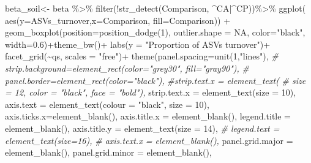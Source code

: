 \documentclass[]{interact}
\theoremstyle{plain}%
\theoremstyle{definition}
\theoremstyle{remark}
\newenvironment{Shaded}{\begin{snugshade}}{\end{snugshade}}
\newcommand{\AttributeTok}[1]{\textcolor[rgb]{0.77,0.63,0.00}{#1}}
\newcommand{\CommentTok}[1]{\textcolor[rgb]{0.56,0.35,0.01}{\textit{#1}}}
\newcommand{\ConstantTok}[1]{\textcolor[rgb]{0.00,0.00,0.00}{#1}}
\newcommand{\DecValTok}[1]{\textcolor[rgb]{0.00,0.00,0.81}{#1}}
\newcommand{\FloatTok}[1]{\textcolor[rgb]{0.00,0.00,0.81}{#1}}
\newcommand{\FunctionTok}[1]{\textcolor[rgb]{0.00,0.00,0.00}{#1}}
\newcommand{\NormalTok}[1]{#1}
\newcommand{\OtherTok}[1]{\textcolor[rgb]{0.56,0.35,0.01}{#1}}
\newcommand{\SpecialCharTok}[1]{\textcolor[rgb]{0.00,0.00,0.00}{#1}}
\newcommand{\StringTok}[1]{\textcolor[rgb]{0.31,0.60,0.02}{#1}}
\begin{document}
\begin{Shaded}
\begin{Highlighting}[]
\NormalTok{beta\_soil}\OtherTok{\textless{}{-}}\NormalTok{ beta }\SpecialCharTok{\%\textgreater{}\%}
  \FunctionTok{filter}\NormalTok{(}\SpecialCharTok{!}\FunctionTok{str\_detect}\NormalTok{(Comparison, }\StringTok{\textquotesingle{}\^{}CA|\^{}CP\textquotesingle{}}\NormalTok{))}\SpecialCharTok{\%\textgreater{}\%} \FunctionTok{ggplot}\NormalTok{(}
    \FunctionTok{aes}\NormalTok{(}\AttributeTok{y=}\StringTok{\textasciigrave{}}\AttributeTok{ASVs\_turnover}\StringTok{\textasciigrave{}}\NormalTok{,}\AttributeTok{x=}\NormalTok{Comparison,  }\AttributeTok{fill=}\NormalTok{Comparison)) }\SpecialCharTok{+}
  \FunctionTok{geom\_boxplot}\NormalTok{(}\AttributeTok{position=}\FunctionTok{position\_dodge}\NormalTok{(}\DecValTok{1}\NormalTok{), }\AttributeTok{outlier.shape =} \ConstantTok{NA}\NormalTok{, }\AttributeTok{color=}\StringTok{"black"}\NormalTok{,}
               \AttributeTok{width=}\FloatTok{0.6}\NormalTok{)}\SpecialCharTok{+}\FunctionTok{theme\_bw}\NormalTok{()}\SpecialCharTok{+}
  \FunctionTok{labs}\NormalTok{(}\AttributeTok{y =} \StringTok{"Proportion of ASVs turnover"}\NormalTok{)}\SpecialCharTok{+}
  \FunctionTok{facet\_grid}\NormalTok{(}\SpecialCharTok{\textasciitilde{}}\NormalTok{qs, }\AttributeTok{scales =} \StringTok{"free"}\NormalTok{)}\SpecialCharTok{+}
  \FunctionTok{theme}\NormalTok{(}\AttributeTok{panel.spacing=}\FunctionTok{unit}\NormalTok{(}\DecValTok{1}\NormalTok{,}\StringTok{"lines"}\NormalTok{),}
        \CommentTok{\# strip.background=element\_rect(color="grey30", fill="gray90"),}
        \CommentTok{\# panel.border=element\_rect(color="black"),}
        \CommentTok{\#strip.text.x = element\_text(}
        \CommentTok{\#  size = 12, color = "black", face = "bold"),}
        \AttributeTok{strip.text.x =} \FunctionTok{element\_text}\NormalTok{(}\AttributeTok{size =} \DecValTok{10}\NormalTok{),}
        \AttributeTok{axis.text =}  \FunctionTok{element\_text}\NormalTok{(}\AttributeTok{colour =} \StringTok{"black"}\NormalTok{, }\AttributeTok{size =} \DecValTok{10}\NormalTok{),}
        \AttributeTok{axis.ticks.x=}\FunctionTok{element\_blank}\NormalTok{(), }
        \AttributeTok{axis.title.x =} \FunctionTok{element\_blank}\NormalTok{(), }
        \AttributeTok{legend.title =} \FunctionTok{element\_blank}\NormalTok{(),}
        \AttributeTok{axis.title.y =} \FunctionTok{element\_text}\NormalTok{(}\AttributeTok{size =} \DecValTok{14}\NormalTok{),}
        \CommentTok{\# legend.text = element\_text(size=16), }
        \CommentTok{\# axis.text.x = element\_blank(),}
        \AttributeTok{panel.grid.major =} \FunctionTok{element\_blank}\NormalTok{(), }\AttributeTok{panel.grid.minor =} \FunctionTok{element\_blank}\NormalTok{(),}

\end{Highlighting}
\end{Shaded}
\end{document}
